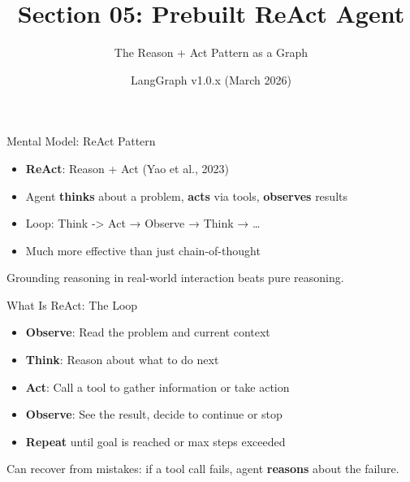 \documentclass[aspectratio=169,11pt]{beamer}
\title{Section 05: Prebuilt ReAct Agent}
\subtitle{The Reason + Act Pattern as a Graph}
\author{LangGraph v1.0.x (March 2026)}
\date{}
\begin{document}
\frame{\titlepage}

\begin{frame}{Mental Model: ReAct Pattern}
  \begin{conceptbox}
    \setlength{\itemsep}{1pt}
    \begin{itemize}
      \item \textbf{ReAct}: Reason + Act (Yao et al., 2023)
      \item Agent \textbf{thinks} about a problem, \textbf{acts} via tools, \textbf{observes} results
      \item Loop: Think -> Act → Observe → Think → \ldots
      \item Much more effective than just chain-of-thought
    \end{itemize}
  \end{conceptbox}
  \vspace{0.1cm}
  \begin{tipbox}
    Grounding reasoning in real-world interaction beats pure reasoning.
  \end{tipbox}
\end{frame}

\begin{frame}{What Is ReAct: The Loop}
  \begin{conceptbox}
    \setlength{\itemsep}{1pt}
    \begin{itemize}
      \item \textbf{Observe}: Read the problem and current context
      \item \textbf{Think}: Reason about what to do next
      \item \textbf{Act}: Call a tool to gather information or take action
      \item \textbf{Observe}: See the result, decide to continue or stop
      \item \textbf{Repeat} until goal is reached or max steps exceeded
    \end{itemize}
  \end{conceptbox}
  \vspace{0.1cm}
  \begin{tipbox}
    Can recover from mistakes: if a tool call fails, agent \textbf{reasons} about the failure.
  \end{tipbox}
\end{frame}
\end{document}
